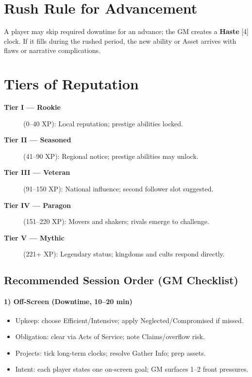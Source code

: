 \section{Rush Rule for Advancement}
\label{sec:rush-rule}
A player may skip required downtime for an advance; the GM creates a \textbf{Haste} [4] clock. If it fills during the rushed period, the new ability or Asset arrives with flaws or narrative complications.

\section{Tiers of Reputation}
\label{sec:reputation-tiers}

\begin{description}
\item[\textbf{Tier I — Rookie}] (0–40 XP): Local reputation; prestige abilities locked. 
\item[\textbf{Tier II — Seasoned}] (41–90 XP): Regional notice; prestige abilities may unlock. 
\item[\textbf{Tier III — Veteran}] (91–150 XP): National influence; second follower slot suggested. 
\item[\textbf{Tier IV — Paragon}] (151–220 XP): Movers and shakers; rivals emerge to challenge. 
\item[\textbf{Tier V — Mythic}] (221+ XP): Legendary status; kingdoms and cults respond directly. 
\end{description}

\subsection{Recommended Session Order (GM Checklist)}

\paragraph{1) Off-Screen (Downtime, 10–20 min)}
\begin{itemize}
  \item Upkeep: choose Efficient/Intensive; apply Neglected/Compromised if missed.
  \item Obligation: clear via Acts of Service; note Claims/overflow risk.
  \item Projects: tick long-term clocks; resolve Gather Info; prep assets.
  \item Intent: each player states one on-screen goal; GM surfaces 1–2 front pressures.
\end{itemize}

